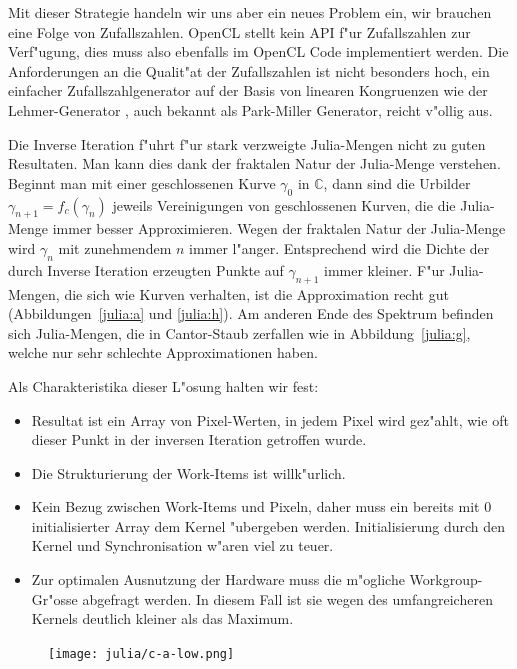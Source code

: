 \begin{refsection}
Mit dieser Strategie handeln wir uns aber ein neues Problem ein, wir brauchen
eine Folge von Zufallszahlen.
OpenCL stellt kein API f"ur Zufallszahlen zur Verf"ugung, dies muss also
ebenfalls im OpenCL Code implementiert werden.
Die Anforderungen an die Qualit"at der Zufallszahlen ist nicht besonders
hoch, ein einfacher Zufallszahlgenerator auf der Basis von linearen
Kongruenzen wie der Lehmer-Generator \cite{julia:lehmer},
auch bekannt als Park-Miller Generator, reicht v"ollig aus.

Die Inverse Iteration f"uhrt f"ur stark verzweigte Julia-Mengen nicht
zu guten Resultaten.
Man kann dies dank der fraktalen Natur der Julia-Menge verstehen.
Beginnt man mit einer geschlossenen Kurve $\gamma_0$ in $\mathbb C$,
dann sind die Urbilder $\gamma_{n+1} = f_c(\gamma_n)$ jeweils Vereinigungen
von geschlossenen Kurven, die die Julia-Menge immer besser Approximieren.
Wegen der fraktalen Natur der Julia-Menge wird $\gamma_{n}$ mit zunehmendem
$n$ immer l"anger.
Entsprechend wird die Dichte der durch Inverse Iteration
erzeugten Punkte auf $\gamma_{n+1}$ immer kleiner. 
F"ur Julia-Mengen, die sich wie Kurven verhalten, ist die Approximation
recht gut (Abbildungen~\ref{julia:a} und \ref{julia:h}).
Am anderen Ende des Spektrum befinden sich Julia-Mengen, die in Cantor-Staub
zerfallen wie in Abbildung~\ref{julia:g}, welche nur sehr schlechte
Approximationen haben.

Als Charakteristika dieser L"osung halten wir fest:
\begin{itemize}
\item Resultat ist ein Array von Pixel-Werten, in jedem Pixel wird
gez"ahlt, wie oft dieser Punkt in der inversen Iteration getroffen wurde.
\item Die Strukturierung der Work-Items ist willk"urlich.
\item Kein Bezug zwischen Work-Items und Pixeln, daher muss ein bereits
mit 0 initialisierter Array dem Kernel "ubergeben werden.
Initialisierung durch den Kernel und Synchronisation w"aren viel zu teuer.
\item
Zur optimalen Ausnutzung der
Hardware muss die m"ogliche Workgroup-Gr"osse abgefragt werden.
In diesem Fall ist sie wegen des umfangreicheren
Kernels deutlich kleiner als das Maximum.
\end{itemize}

\begin{figure}
\begin{center}
\texttt{[image: julia/c-a-low.png]}

\bigskip


\end{center}
\end{figure}
\end{refsection}

